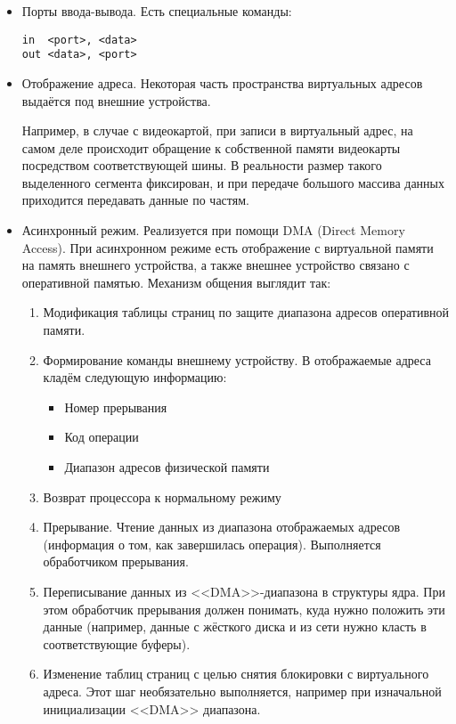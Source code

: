 \begin{itemize}
\item Порты ввода-вывода. Есть специальные команды:
\begin{verbatim}
in  <port>, <data>
out <data>, <port>
\end{verbatim}
\item Отображение адреса. Некоторая часть пространства виртуальных адресов выдаётся под внешние устройства. 

Например, в случае с видеокартой, при записи в виртуальный адрес, на самом деле происходит обращение к собственной памяти видеокарты посредством соответствующей шины. В реальности размер такого выделенного сегмента фиксирован, и при передаче большого массива данных приходится передавать данные по частям.
\item Асинхронный режим. Реализуется при помощи DMA (Direct Memory Access). При асинхронном режиме есть отображение с виртуальной памяти на память внешнего устройства, а также внешнее устройство связано с оперативной памятью. Механизм общения выглядит так:
\begin{enumerate}
\item Модификация таблицы страниц по защите диапазона адресов оперативной памяти.
\item Формирование команды внешнему устройству. В отображаемые адреса кладём следующую информацию:
\begin{itemize}
\item Номер прерывания
\item Код операции
\item Диапазон адресов физической памяти
\end{itemize}
\item Возврат процессора к нормальному режиму
\item Прерывание. Чтение данных из диапазона отображаемых адресов (информация о том, как завершилась операция). Выполняется обработчиком прерывания.
\item Переписывание данных из <<DMA>>-диапазона в структуры ядра. При этом обработчик прерывания должен понимать, куда нужно положить эти данные (например, данные с жёсткого диска и из сети нужно класть в соответствующие буферы).
\item Изменение таблиц страниц с целью снятия блокировки с виртуального адреса. Этот шаг необязательно выполняется, например при изначальной инициализации <<DMA>> диапазона.
\end{enumerate}
\end{itemize}

